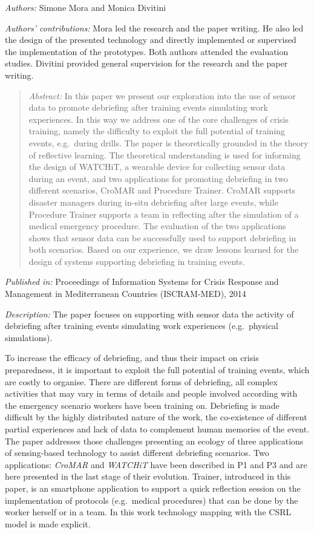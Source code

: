 \emph{Authors:} Simone Mora and Monica Divitini

\emph{Authors' contributions:} Mora led the research and the paper writing. He also led the design of the presented technology and directly implemented or supervised the implementation of the prototypes. Both authors attended the evaluation studies. Divitini provided general supervision for the research and the paper writing.

\begin{quote}
	\emph{Abstract:} In this paper we present our exploration into the use of sensor data to promote debriefing after training events simulating work experiences. In this way we address one of the core challenges of crisis training, namely the difficulty to exploit the full potential of training events, e.g.~during drills. The paper is theoretically grounded in the theory of reflective learning. The theoretical understanding is used for informing the design of WATCHiT, a wearable device for collecting sensor data during an event, and two applications for promoting debriefing in two different scenarios, CroMAR and Procedure Trainer. CroMAR supports disaster managers during in-situ debriefing after large events, while Procedure Trainer supports a team in reflecting after the simulation of a medical emergency procedure. The evaluation of the two applications shows that sensor data can be successfully used to support debriefing in both scenarios. Based on our experience, we draw lessons learned for the design of systems supporting debriefing in training events. 
\end{quote}

\emph{Published in:} Proceedings of Information Systems for Crisis Response and Management in Mediterranean Countries (ISCRAM-MED), 2014

\emph{Description:} The paper focuses on supporting with sensor data the activity of debriefing after training events simulating work experiences (e.g.~physical simulations). 

To increase the efficacy of debriefing, and thus their impact on crisis preparedness, it is important to exploit the full potential of training events, which are costly to organise. There are different forms of debriefing, all complex activities that may vary in terms of details and people involved according with the emergency scenario workers have been training on. Debriefing is made difficult by the highly distributed nature of the work, the co-existence of different partial experiences and lack of data to complement human memories of the event. The paper addresses those challenges presenting an ecology of three applications of sensing-based technology to assist different debriefing scenarios. Two applications: \emph{CroMAR} and \emph{WATCHiT} have been described in P1 and P3 and are here presented in the last stage of their evolution. Trainer, introduced in this paper, is an smartphone application to support a quick reflection session on the implementation of protocols (e.g.~medical procedures) that can be done by the worker herself or in a team. In this work technology mapping with the CSRL model is made explicit.

